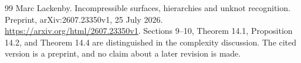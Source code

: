 \documentclass[11pt]{article}
\theoremstyle{definition}
\theoremstyle{remark}
\begin{document}
\begin{thebibliography}{99}
Marc Lackenby.
Incompressible surfaces, hierarchies and unknot recognition.
Preprint, arXiv:2607.23350v1, 25 July 2026.
\url{https://arxiv.org/html/2607.23350v1}.
Sections 9--10, Theorem 14.1, Proposition 14.2, and Theorem 14.4
are distinguished in the complexity discussion. The cited version
is a preprint, and no claim about a later revision is made.

\end{thebibliography}

\end{document}
